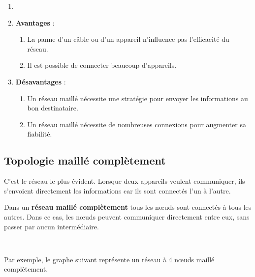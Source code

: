\documentclass[11pt, a4paper]{book}
\begin{document}
\begin{remarques}
\begin{enumerate}
\item[]
\item {\bf Avantages} : 
	\begin{enumerate}
		\item La panne d'un câble ou d'un appareil n'influence pas l'efficacité du réseau.
		\item Il est possible de connecter beaucoup d'appareils.\\
	\end{enumerate}
\item {\bf Désavantages} :
	\begin{enumerate}
		\item Un réseau maillé nécessite une stratégie pour envoyer les informations au bon destinataire.
		\item Un réseau maillé nécessite de nombreuses connexions pour augmenter sa fiabilité.
	\end{enumerate}
\end{enumerate}
\end{remarques}







\subsection{Topologie maillé complètement}

C'est le réseau le plus évident. Lorsque deux appareils veulent communiquer, ils s'envoient directement les informations car ils sont connectés l'un à l'autre. 

\begin{defi}
Dans un {\bf réseau  maillé complètement} tous les nœuds sont connectés à tous les autres. Dans ce cas, les nœuds peuvent communiquer directement entre eux, sans passer par aucun intermédiaire.
\end{defi}

\ 

Par exemple, le graphe suivant représente un réseau à 4 nœuds maillé complètement.


\begin{center}
\end{center}
\end{document}
